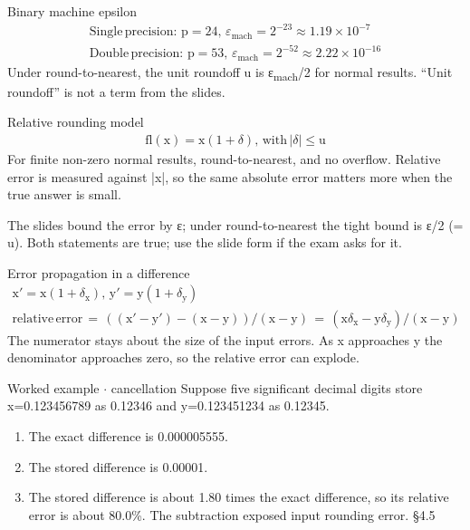 \documentclass[11pt]{article}
\begin{document}
\begin{keepsection}
\begin{keepsection}
\begin{equationcard}{Binary machine epsilon}
\[ \begin{gathered} \text{Single}\, \text{precision}:\, \mathrm{p}=24,\, ε_{\text{mach}}=2^{-23}\approx 1.19\times 10^{-7} \\ \text{Double}\, \text{precision}:\, \mathrm{p}=53,\, ε_{\text{mach}}=2^{-52}\approx 2.22\times 10^{-16} \end{gathered} \]
{\small Under round-to-nearest, the unit roundoff u is ε\textsubscript{mach}/2 for normal results. “Unit roundoff” is not a term from the slides.}
\end{equationcard}

\begin{equationcard}{Relative rounding model}
\[ \begin{gathered} \text{fl}(\mathrm{x})=\mathrm{x}(1+δ),\, \text{with}\, |δ|\leq \mathrm{u} \end{gathered} \]
{\small For finite non-zero normal results, round-to-nearest, and no overflow. Relative error is measured against |x|, so the same absolute error matters more when the true answer is small.}
\end{equationcard}

The slides bound the error by ε; under round-to-nearest the tight bound is ε/2 (= u). Both statements are true; use the slide form if the exam asks for it.

\begin{equationcard}{Error propagation in a difference}
\[ \begin{gathered} \mathrm{x}′=\mathrm{x}(1+δ_{\mathrm{x}}),\, \mathrm{y}′=\mathrm{y}(1+δ_{\mathrm{y}}) \\ \text{relative}\, \text{error}\, =\, ((\mathrm{x}′-\mathrm{y}′)-(\mathrm{x}-\mathrm{y}))/(\mathrm{x}-\mathrm{y})\, =\, (\mathrm{x}δ_{\mathrm{x}}-\mathrm{y}δ_{\mathrm{y}})/(\mathrm{x}-\mathrm{y}) \end{gathered} \]
{\small The numerator stays about the size of the input errors. As x approaches y the denominator approaches zero, so the relative error can explode.}
\end{equationcard}

\begin{workedbox}{Worked example \ensuremath{\cdot} cancellation}
Suppose five significant decimal digits store x=0.123456789 as 0.12346 and y=0.123451234 as 0.12345.

\begin{enumerate}
\item The exact difference is 0.000005555.
\item The stored difference is 0.00001.
\item The stored difference is about 1.80 times the exact difference, so its relative error is about 80.0\%. The subtraction exposed input rounding error. \hfill{\small\color{FAUblue}§4.5}
\end{enumerate}
\end{workedbox}
\end{keepsection}


\end{keepsection}
\end{document}

